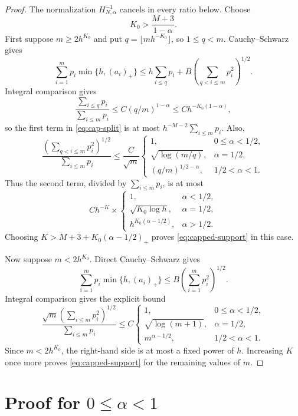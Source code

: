 \documentclass[11pt]{article}
\theoremstyle{remark}
\newcommand{\1}{\mathbf 1}
\begin{document}
\begin{proof}
The normalization $H_{N,\alpha}^{-1}$ cancels in every ratio below.
Choose
\[
 K_0>\frac{M+3}{1-\alpha}.
\]
First suppose $m\geq2h^{K_0}$ and put
$q=\lfloor mh^{-K_0}\rfloor$, so $1\leq q<m$.  Cauchy--Schwarz gives
\begin{equation}
 \sum_{i=1}^mp_i\min\{h,(a_i)_+\}
 \leq h\sum_{i\leq q}p_i
 +B\left(\sum_{q<i\leq m}p_i^2\right)^{1/2}.
 \label{eq:cap-split}
\end{equation}
Integral comparison gives
\[
 \frac{\sum_{i\leq q}p_i}{\sum_{i\leq m}p_i}
 \leq C(q/m)^{1-\alpha}
 \leq Ch^{-K_0(1-\alpha)},
\]
so the first term in \eqref{eq:cap-split} is at most
$h^{-M-2}\sum_{i\leq m}p_i$.  Also,
\[
 \frac{(\sum_{q<i\leq m}p_i^2)^{1/2}}
 {\sum_{i\leq m}p_i}
 \leq\frac C{\sqrt m}
 \begin{cases}
 1,&0\leq\alpha<1/2,\\
 \sqrt{\log(m/q)},&\alpha=1/2,\\
 (q/m)^{1/2-\alpha},&1/2<\alpha<1.
 \end{cases}
\]
Thus the second term, divided by $\sum_{i\leq m}p_i$, is at most
\[
 Ch^{-K}\times
 \begin{cases}
 1,&\alpha<1/2,\\
 \sqrt{K_0\log h},&\alpha=1/2,\\
 h^{K_0(\alpha-1/2)},&\alpha>1/2.
 \end{cases}
\]
Choosing
$K>M+3+K_0(\alpha-1/2)_+$ proves \eqref{eq:capped-support} in this
case.

Now suppose $m<2h^{K_0}$.  Direct Cauchy--Schwarz gives
\[
 \sum_{i=1}^mp_i\min\{h,(a_i)_+\}
 \leq B\left(\sum_{i=1}^mp_i^2\right)^{1/2}.
\]
Integral comparison gives the explicit bound
\[
 \frac{\sqrt m(\sum_{i\leq m}p_i^2)^{1/2}}
 {\sum_{i\leq m}p_i}
 \leq C
 \begin{cases}
 1,&0\leq\alpha<1/2,\\
 \sqrt{\log(m+1)},&\alpha=1/2,\\
 m^{\alpha-1/2},&1/2<\alpha<1.
 \end{cases}
\]
Since $m<2h^{K_0}$, the right-hand side is at most a fixed power of
$h$.  Increasing $K$ once more proves \eqref{eq:capped-support} for the
remaining values of $m$.
\end{proof}

\section{Proof for $0\leq\alpha<1$}
\end{document}
